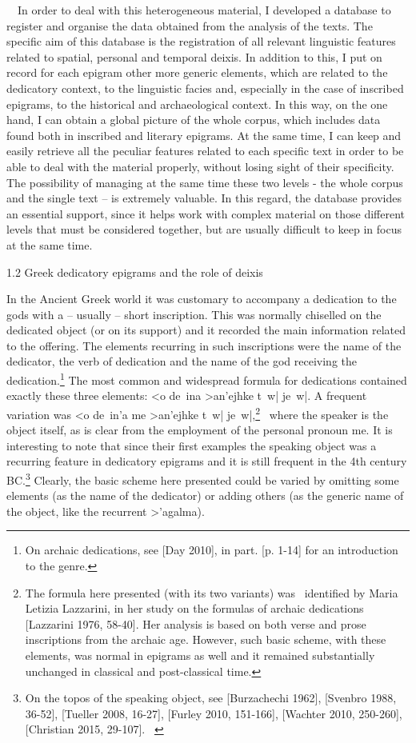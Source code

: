 \documentclass[amsthm,ebook]{saparticle}
\begin{document}
\ \ In order to deal with this heterogeneous material, I developed a database to register and organise the data obtained
from the analysis of the texts. The specific aim of this database is the registration of all relevant linguistic
features related to spatial, personal and temporal deixis. In addition to this, I put on record for each epigram other
more generic elements, which are related to the dedicatory context, to the linguistic facies and, especially in the
case of inscribed epigrams, to the historical and archaeological context. In this way, on the one hand, I can obtain a
global picture of the whole corpus, which includes data found both in inscribed and literary epigrams. At the same
time, I can keep and easily retrieve all the peculiar features related to each specific text in order to be able to
deal with the material properly, without losing sight of their specificity. The possibility of managing at the same
time these two levels - the whole corpus and the single text – is extremely valuable. In this regard, the database
provides an essential support, since it helps work with complex material on those different levels that must be
considered together, but are usually difficult to keep in focus at the same time.


\bigskip

1.2 Greek dedicatory epigrams and the role of deixis

In the Ancient Greek world it was customary to accompany a dedication to the gods with a – usually – short inscription.
This was normally chiselled on the dedicated object (or on its support) and it recorded the main information related to
the offering. The elements recurring in such inscriptions were the name of the dedicator, the verb of dedication and
the name of the god receiving the dedication.\footnote{ On archaic dedications, see [Day 2010], in part. [p. 1-14] for
an introduction to the genre.} The most common and widespread formula for dedications contained exactly these three
elements: \textgreek{<o de~ina >an'ejhke t~w| je~w|. }A frequent variation was \textgreek{<o de~in'a me >an'ejhke t~w|
je~w|,}\footnote{ The formula here presented (with its two variants) was \ identified by Maria Letizia Lazzarini, in
her study on the formulas of archaic dedications [Lazzarini 1976, 58-40]. Her analysis is based on both verse and prose
inscriptions from the archaic age. However, such basic scheme, with these elements, was normal in epigrams as well and
it remained substantially unchanged in classical and post-classical time.} \ where the speaker is the object itself, as
is clear from the employment of the personal pronoun \textgreek{me. }It is interesting to note that since their first
examples the speaking object was a recurring feature in dedicatory epigrams and it is still frequent in the 4th century
BC.\footnote{ On the topos of the speaking object, see [Burzachechi 1962], [Svenbro 1988, 36-52], [Tueller 2008,
16-27], [Furley 2010, 151-166], [Wachter 2010, 250-260], [Christian 2015, 29-107]. \ } Clearly, the basic scheme here
presented could be varied by omitting some elements (as the name of the dedicator) or adding others (as the generic
name of the object, like the recurrent \textgreek{>'agalma).}
\end{document}
